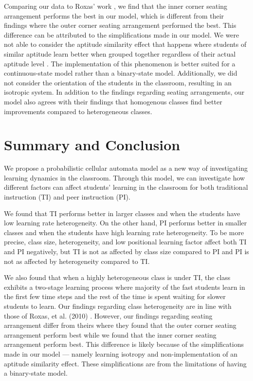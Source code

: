 \documentclass[twocolumn,secnumarabic,amssymb, nobibnotes, aps, prd]{revtex4-2}
\begin{document}
        Comparing our data to Roxas' work \cite{roxas2010seating}, we find that the inner corner seating arrangement performs the best in our model, which is different from their findings where the outer corner seating arrangement performed the best.
        This difference can be attributed to the simplifications made in our model.
        We were not able to consider the aptitude similarity effect that happens where students of similar aptitude learn better when grouped together regardless of their actual aptitude level \cite{smith2009peer}.
        The implementation of this phenomenon is better suited for a continuous-state model rather than a binary-state model.
        Additionally, we did not consider the orientation of the students in the classroom, resulting in an isotropic system.
        In addition to the findings regarding seating arrangements, our model also agrees with their findings that homogenous classes find better improvements compared to heterogeneous classes.
    
\section{Summary and Conclusion}
    We propose a probabilistic cellular automata model as a new way of investigating learning dynamics in the classroom.
    Through this model, we can investigate how different factors can affect students' learning in the classroom for both traditional instruction (TI) and peer instruction (PI).

    We found that TI performs better in larger classes and when the students have low learning rate heterogeneity.
    On the other hand, PI performs better in smaller classes and when the students have high learning rate heterogeneity.
    To be more precise, class size, heterogeneity, and low positional learning factor affect both TI and PI negatively, but TI is not as affected by class size compared to PI and PI is not as affected by heterogeneity compared to TI.

    We also found that when a highly heterogeneous class is under TI, the class exhibits a two-stage learning process where majority of the fast students learn in the first few time steps and the rest of the time is spent waiting for slower students to learn. Our findings regarding class heterogeneity are in line with those of Roxas, et al. (2010) \cite{roxas2010seating}.
    However, our findings regarding seating arrangement differ from theirs where they found that the outer corner seating arrangement perform best while we found that the inner corner seating arrangement perform best.
    This difference is likely because of the simplifications made in our model --- namely learning isotropy and non-implementation of an aptitude similarity effect.
    These simplifications are from the limitations of having a binary-state model.
\end{document}

